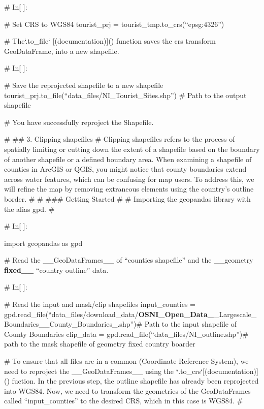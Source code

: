 \documentclass[letterpaper,10pt,english]{sphinxmanual}
\begin{document}
\sphinxAtStartPar
\# In{[} {]}:

\sphinxAtStartPar
\# Set CRS to WGS84
tourist\_prj = tourist\_tmp.to\_crs(“epsg:4326”)

\sphinxAtStartPar
\# The`.to\_file` {[}(documentation){]}() function saves the crs transform GeoDataFrame, into a new shapefile.

\sphinxAtStartPar
\# In{[} {]}:

\sphinxAtStartPar
\# Save the re\sphinxhyphen{}projected shapefile to a new shapefile
tourist\_prj.to\_file(“data\_files/NI\_Tourist\_Sites.shp”) \# Path to the output shapefile

\sphinxAtStartPar
\# You have successfully re\sphinxhyphen{}project the Shapefile.

\sphinxAtStartPar
\# \#\# 3. Clipping shapefiles
\# Clipping shapefiles refers to the process of spatially limiting or cutting down the extent of a shapefile based on the boundary of another shapefile or a defined boundary area. When examining a shapefile of counties in ArcGIS or QGIS, you might notice that county boundaries extend across water features, which can be confusing for map users. To address this, we will refine the map by removing extraneous elements using the country’s outline border.
\#
\# \#\#\# Getting Started
\#
\# Importing the geopandas library with the alias gpd.
\#

\sphinxAtStartPar
\# In{[} {]}:

\sphinxAtStartPar
import geopandas as gpd

\sphinxAtStartPar
\# Read the \_\_GeoDataFrames\_\_ of “counties shapefile” and the \_\_geometry {\color{red}\bfseries{}fixed\_\_} “country outline” data.

\sphinxAtStartPar
\# In{[} {]}:

\sphinxAtStartPar
\# Read the input and mask/clip shapefiles
input\_counties = gpd.read\_file(“data\_files/download\_data/{\color{red}\bfseries{}OSNI\_Open\_Data\_}\sphinxhyphen{}\_Largescale\_Boundaries\_\sphinxhyphen{}\_County\_Boundaries\_.shp”)\# Path to the input shapefile of County Boundaries
clip\_data = gpd.read\_file(“data\_files/NI\_outline.shp”)\# path to the mask shapefile of geometry fixed country boarder

\sphinxAtStartPar
\# To ensure that all files are in a common  (Coordinate Reference System), we need to reproject the \_\_GeoDataFrames\_\_ using the  {\color{red}\bfseries{}`}.to\_crs`{[}(documentation){]}() fuction. In the previous step, the outline shapefile has already been reprojected into WGS84. Now, we need to transform the geometries of the GeoDataFrames called “input\_counties” to the desired CRS, which in this case is WGS84.
\#
\end{document}
